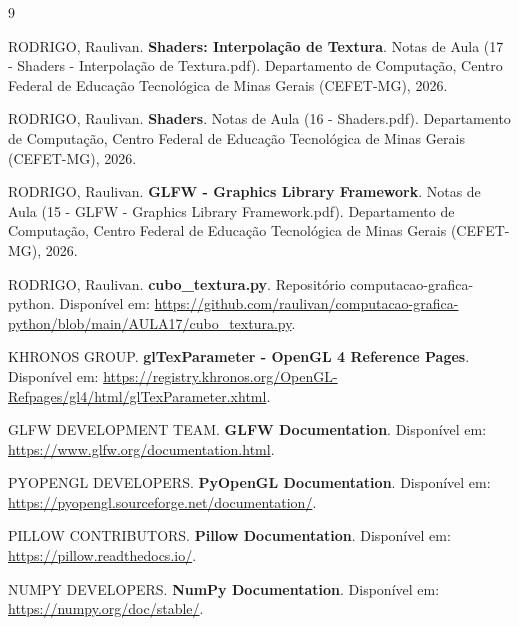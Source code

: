 \documentclass{article}
\begin{document}
\begin{thebibliography}{9}

RODRIGO, Raulivan. \textbf{Shaders: Interpolação de Textura}. Notas de Aula (17 - Shaders - Interpolação de Textura.pdf). Departamento de Computação, Centro Federal de Educação Tecnológica de Minas Gerais (CEFET-MG), 2026.

RODRIGO, Raulivan. \textbf{Shaders}. Notas de Aula (16 - Shaders.pdf). Departamento de Computação, Centro Federal de Educação Tecnológica de Minas Gerais (CEFET-MG), 2026.

RODRIGO, Raulivan. \textbf{GLFW - Graphics Library Framework}. Notas de Aula (15 - GLFW - Graphics Library Framework.pdf). Departamento de Computação, Centro Federal de Educação Tecnológica de Minas Gerais (CEFET-MG), 2026.

RODRIGO, Raulivan. \textbf{cubo\_textura.py}. Repositório computacao-grafica-python. Disponível em: \url{https://github.com/raulivan/computacao-grafica-python/blob/main/AULA17/cubo_textura.py}.

KHRONOS GROUP. \textbf{glTexParameter - OpenGL 4 Reference Pages}. Disponível em: \url{https://registry.khronos.org/OpenGL-Refpages/gl4/html/glTexParameter.xhtml}.

GLFW DEVELOPMENT TEAM. \textbf{GLFW Documentation}. Disponível em: \url{https://www.glfw.org/documentation.html}.

PYOPENGL DEVELOPERS. \textbf{PyOpenGL Documentation}. Disponível em: \url{https://pyopengl.sourceforge.net/documentation/}.

PILLOW CONTRIBUTORS. \textbf{Pillow Documentation}. Disponível em: \url{https://pillow.readthedocs.io/}.

NUMPY DEVELOPERS. \textbf{NumPy Documentation}. Disponível em: \url{https://numpy.org/doc/stable/}.

\end{thebibliography}
\end{document}
